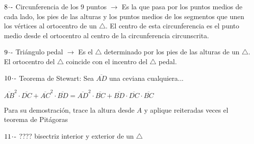 $8\hspace{-0.05cm}\cdot\hspace{-0.05cm}\text{-}$ Circunferencia de los 9 puntos $\longrightarrow$ Es la que pasa por los puntos medios de cada lado, los pies de las alturas y los puntos medios de los segmentos que unen los vértices al ortocentro de un $\triangle$. El centro de esta circunferencia es el punto medio desde el ortocentro al centro de la circunferencia circunscrita.

$9\hspace{-0.05cm}\cdot\hspace{-0.05cm}\text{-}$ Triángulo pedal $\longrightarrow$ Es el $\triangle$ determinado por los pies de las alturas de un $\triangle$. El ortocentro del $\triangle$ coincide con el incentro del $\triangle$ pedal.

$ 10\hspace{-0.05cm}\cdot\hspace{-0.05cm}\text{-} $ Teorema de Stewart: Sea $\overline{AD} $ una ceviana cualquiera...

\noindent\parbox[][][t]{.4\linewidth}{
}
\parbox[][][t]{.05\linewidth}{\hspace{.05\linewidth}}
\parbox[][][t]{.55\linewidth}{
 $\overline{AB}^2\cdot\overline{DC} + \overline{AC}^2\cdot\overline{BD} = \overline{AD}^2\cdot\overline{BC} + \overline{BD}\cdot\overline{DC}\cdot\overline{BC}$
 
 \vspace{0.4cm}
 
 Para su demostración, trace la altura desde $A$ y aplique reiteradas veces el teorema de Pitágoras
 
}

\vspace{0.4cm}

$ 11\hspace{-0.05cm}\cdot\hspace{-0.05cm}\text{-} $  ???? bisectriz interior y exterior de un $\triangle$

